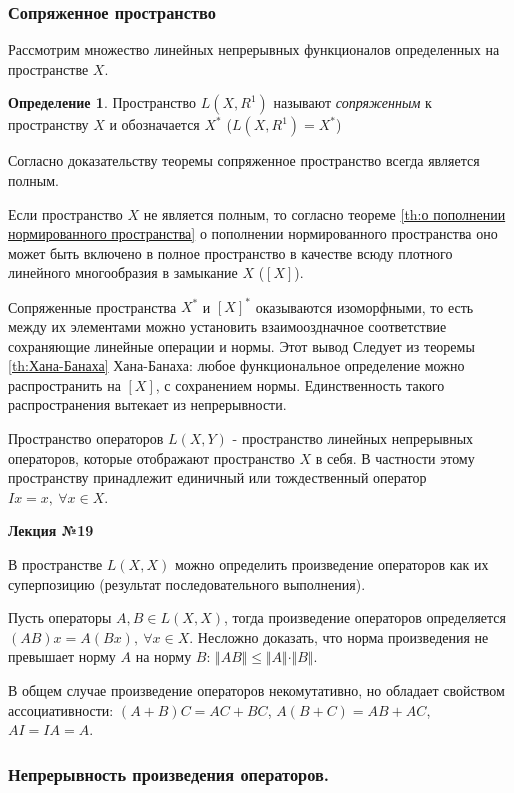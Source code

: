 \documentclass[14pt,a4paper]{extarticle}
\theoremstyle{definition}
\newtheorem{definition}{Определение}[section]
\theoremstyle{remark}
\renewcommand{\[}{\begin{dmath*}[compact]}
\renewcommand{\]}{\end{dmath*}}
\newcommand{\sep}{ , \ \allowbreak }
\begin{document}
\subsubsection{Сопряженное пространство}

Рассмотрим множество линейных непрерывных функционалов определенных на
пространстве $X$.

\begin{definition}
  Пространство $L(X,R^1)$ называют \textit{сопряженным} к пространству $X$ и
  обозначается $X^*$ ($L(X,R^1)=X^*$)
\end{definition}

Согласно доказательству теоремы сопряженное пространство всегда является полным.

Если пространство $X$ не является полным, то согласно теореме
\ref{th:о пополнении нормированного пространства}
о пополнении нормированного пространства оно может быть включено в полное
пространство в качестве всюду плотного линейного многообразия в замыкание $X$
($[X]$).

Сопряженные пространства $X^*$ и $[X]^*$ оказываются изоморфными, то есть между
их элементами можно установить взаимооздначное соответствие сохраняющие
линейные операции и нормы. Этот вывод Следует из теоремы \ref{th:Хана-Банаха}
Хана-Банаха: любое функциональное определение можно распространить на $[X]$,
с сохранением нормы.
Единственность такого распространения вытекает из непрерывности.

Пространство операторов $L(X,Y)$ - пространство линейных непрерывных
операторов, которые отображают пространство $X$ в себя. В частности этому
пространству принадлежит единичный или тождественный оператор
$Ix=x \sep \forall x \in X$.

\textbf{Лекция №19}

В пространстве $L(X,X)$ можно определить произведение операторов как их
суперпозицию (результат последовательного выполнения).

Пусть операторы $A,B \in L(X,X)$, тогда произведение операторов определяется
$(AB)x = A(Bx) \sep \forall x \in X$.
Несложно доказать, что норма произведения не превышает норму $A$ на норму $B$:
$\Vert AB \Vert \leq \Vert A \Vert \cdot \Vert B \Vert$.

В общем случае произведение операторов некомутативно,
но обладает свойством ассоциативности: $(A+B)C = AC+BC$, $A(B+C) = AB+AC$,
$AI = IA = A$.

\subsubsection{Непрерывность произведения операторов.}
\end{document}
